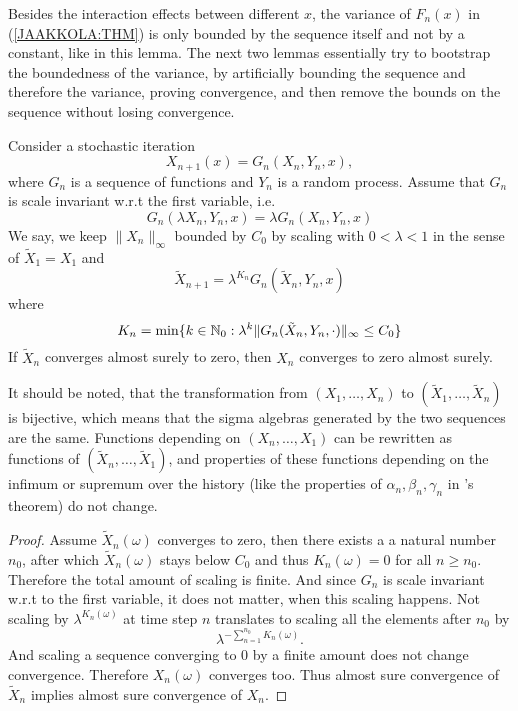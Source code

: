 Besides the interaction effects between different \(x\), the variance of \(F_n(x)\) in (\ref{JAAKKOLA:THM}) is only bounded by the sequence itself and not by a constant, like in this lemma. The next two lemmas essentially try to bootstrap the boundedness of the variance, by artificially bounding the sequence and therefore the variance, proving convergence, and then remove the bounds on the sequence without losing convergence.

\begin{lemma}
    Consider a stochastic iteration 
    \[
        X_{n+1}(x)=G_n(X_n, Y_n,x),
    \]
    where \(G_n\) is a sequence of functions and \(Y_n\) is a random process. Assume that \(G_n\) is scale invariant w.r.t the first variable, i.e.
    \[
        G_n(\lambda X_n, Y_n, x)=\lambda G_n(X_n,Y_n,x)
    \]
    We say, we keep \(\|X_n\|_\infty\) bounded by \(C_0\) by scaling with \(0<\lambda<1\) in the sense of \(\tilde{X}_1=X_1\) and
    \[
        \tilde{X}_{n+1} =\lambda^{K_n} G_n(\tilde{X}_n, Y_n,x)
    \]
    where
    \[
        K_n=\min\{k\in\mathbb{N}_0 : \lambda^k \|G_n(\tilde{X}_n, Y_n,\cdot)\|_\infty \le C_0\}
    \]
    If \(\tilde{X}_n\) converges almost surely to zero, then \(X_n\) converges to zero almost surely. 
\end{lemma}
\begin{remark}
    It should be noted, that the transformation from \((X_1, \dots,  X_n)\) to \((\tilde{X}_1, \dots, \tilde{X}_n)\) is bijective, which means that the sigma algebras generated by the two sequences are the same. Functions depending on \((X_n,\dots,X_1)\) can be rewritten as functions of \((\tilde{X}_n,\dots,\tilde{X}_1)\), and properties of these functions depending on the infimum or supremum over the history (like the properties of \(\alpha_n,\beta_n,\gamma_n\) in \citeauthor{dvoretzkyStochasticApproximation1956}'s theorem) do not change.   
\end{remark}
\begin{proof}
    Assume \(\tilde{X}_n(\omega)\) converges to zero, then there exists a a natural number \(n_0\), after which \(\tilde{X}_n(\omega)\) stays below \(C_0\) and thus \(K_n(\omega)=0\) for all \(n\ge n_0\). Therefore the total amount of scaling is finite. And since \(G_n\) is scale invariant w.r.t to the first variable, it does not matter, when this scaling happens. Not scaling by \(\lambda^{K_n(\omega)}\) at time step \(n\) translates to scaling all the elements after \(n_0\) by 
    \[
        \lambda^{-\sum_{n=1}^{n_0}K_n(\omega)}.
    \] 
    And scaling a sequence converging to 0 by a finite amount does not change convergence. Therefore \(X_n(\omega)\) converges too. Thus almost sure convergence of \(\tilde{X}_n\) implies almost sure convergence of \(X_n\).
\end{proof}

